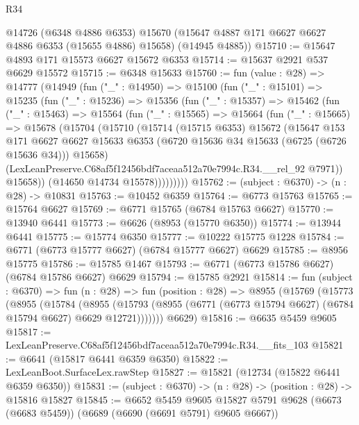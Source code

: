 \begin{lexlean}{R34}
\begin{coremodule}
      @14726
      (@6348 @4886 @6353)
      @15670
      (@15647 @4887 @171 @6627 @6627 @4886 @6353 (@15655 @4886) @15658)
      (@14945 @4885))
@15710 := @15647 @4893 @171 @15573 @6627 @15672 @6353
@15714 := @15637 @2921 @537 @6629 @15572
@15715 := @6348 @15633
@15760 := fun (value : @28) =>
  @14777
    (@14949
      (fun ("_" : @14950) =>
      @15100
        (fun ("_" : @15101) =>
        @15235
          (fun ("_" : @15236) =>
          @15356
            (fun ("_" : @15357) =>
            @15462
              (fun ("_" : @15463) =>
              @15564
                (fun ("_" : @15565) =>
                @15664
                  (fun ("_" : @15665) =>
                  @15678
                    (@15704
                      (@15710
                        (@15714
                          (@15715 @6353)
                          @15672
                          (@15647
                            @153
                            @171
                            @6627
                            @6627
                            @15633
                            @6353
                            (@6720 @15636 @34 @15633 (@6725 (@6726 @15636 @34)))
                            @15658)
                          (LexLeanPreserve.C68af5f12456bdf7aceaa512a70e7994c.R34.__rel_92 @7971))
                        @15658))
                    (@14650 @14734 @15578)))))))))
@15762 := (subject : @6370) -> (n : @28) -> @10831
@15763 := @10452 @6359
@15764 := @6773 @15763
@15765 := @15764 @6627
@15769 := @6771 @15765 (@6784 @15763 @6627)
@15770 := @13940 @6441
@15773 := @6626 (@8953 (@15770 @6350))
@15774 := @13944 @6441
@15775 := @15774 @6350
@15777 := @10222 @15775 @1228
@15784 := @6771 (@6773 @15777 @6627) (@6784 @15777 @6627) @6629
@15785 := @8956 @15775
@15786 := @15785 @1467
@15793 := @6771 (@6773 @15786 @6627) (@6784 @15786 @6627) @6629
@15794 := @15785 @2921
@15814 := fun (subject : @6370) =>
  fun (n : @28) =>
  fun (position : @28) =>
  @8955
    (@15769
      (@15773
        (@8955
          (@15784
            (@8955
              (@15793 (@8955 (@6771 (@6773 @15794 @6627) (@6784 @15794 @6627) @6629 @12721)))))))
      @6629)
@15816 := @6635 @5459 @9605
@15817 := LexLeanPreserve.C68af5f12456bdf7aceaa512a70e7994c.R34.__fits_103
@15821 := @6641 (@15817 @6441 @6359 @6350)
@15822 := LexLeanBoot.SurfaceLex.rawStep
@15827 := @15821 (@12734 (@15822 @6441 @6359 @6350))
@15831 := (subject : @6370) -> (n : @28) -> (position : @28) -> @15816 @15827
@15845 := @6652
    @5459
    @9605
    @15827
    @5791
    @9628
    (@6673 (@6683 @5459))
    (@6689 (@6690 (@6691 @5791) @9605 @6667))

\end{coremodule}
\end{lexlean}
